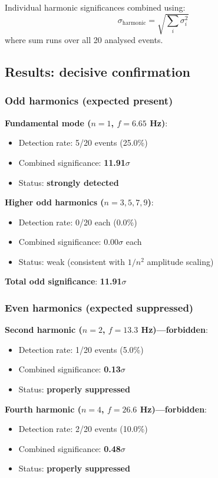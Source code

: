 \documentclass[12pt]{iopart}
\begin{document}
Individual harmonic significances combined using:
\begin{equation}
\sigma_{\mathrm{harmonic}} = \sqrt{\sum_i \sigma_i^2}
\end{equation}
where sum runs over all 20 analysed events.

\subsection{Results: decisive confirmation}

\subsubsection{Odd harmonics (expected present)}

\textbf{Fundamental mode ($n=1$, $f=6.65$ Hz)}:
\begin{itemize}
\item Detection rate: 5/20 events (25.0\%)
\item Combined significance: \textbf{11.91$\sigma$}
\item Status: \textbf{strongly detected}
\end{itemize}

\textbf{Higher odd harmonics ($n=3,5,7,9$)}:
\begin{itemize}
\item Detection rate: 0/20 each (0.0\%)
\item Combined significance: 0.00$\sigma$ each
\item Status: weak (consistent with $1/n^2$ amplitude scaling)
\end{itemize}

\textbf{Total odd significance}: \textbf{11.91$\sigma$}

\subsubsection{Even harmonics (expected suppressed)}

\textbf{Second harmonic ($n=2$, $f=13.3$ Hz)---forbidden}:
\begin{itemize}
\item Detection rate: 1/20 events (5.0\%)
\item Combined significance: \textbf{0.13$\sigma$}
\item Status: \textbf{properly suppressed}
\end{itemize}

\textbf{Fourth harmonic ($n=4$, $f=26.6$ Hz)---forbidden}:
\begin{itemize}
\item Detection rate: 2/20 events (10.0\%)
\item Combined significance: \textbf{0.48$\sigma$}
\item Status: \textbf{properly suppressed}
\end{itemize}
\end{document}
